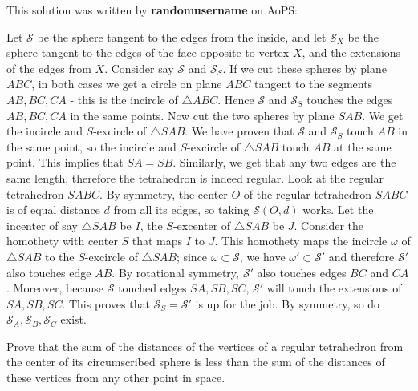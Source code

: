 \documentclass[12pt,a4paper]{memoir}
\theoremstyle{definition}
\begin{document}
\begin{solution}
	This solution was written by \textbf{randomusername} on AoPS:
	\begin{tasks}
		\task Let $\mathcal{S}$ be the sphere tangent to the edges from the inside, and let $\mathcal{S}_X$ be the sphere tangent to the edges of the face opposite to vertex $X$, and the extensions of the edges from $X$.
		Consider say $\mathcal{S}$ and $\mathcal{S}_S$. If we cut these spheres by plane $ABC$, in both cases we get a circle on plane $ABC$ tangent to the segments $AB,BC,CA$ - this is the incircle of $\triangle ABC$. Hence $\mathcal{S}$ and $\mathcal{S}_S$ touches the edges $AB,BC,CA$ in the same points.
		Now cut the two spheres by plane $SAB$. We get the incircle and $S$-excircle of $\triangle SAB$. We have proven that $\mathcal{S}$ and $\mathcal{S}_S$ touch $AB$ in the same point, so the incircle and $S$-excircle of $\triangle SAB$ touch $AB$ at the same point. This implies that $SA=SB$.
		Similarly, we get that any two edges are the same length, therefore the tetrahedron is indeed regular.
		\task Look at the regular tetrahedron $SABC$.
		By symmetry, the center $O$ of the regular tetrahedron $SABC$ is of equal distance $d$ from all its edges, so taking $\mathcal{S}(O,d)$ works.
		Let the incenter of say $\triangle SAB$ be $I$, the $S$-excenter of $\triangle SAB$ be $J$. Consider the homothety with center $S$ that maps $I$ to $J$. This homothety maps the incircle $\omega$ of $\triangle SAB$ to the $S$-excircle of $\triangle SAB$; since $\omega\subset \mathcal{S}$, we have $\omega'\subset\mathcal{S}'$ and therefore $\mathcal{S}'$ also touches edge $AB$. By rotational symmetry, $\mathcal{S}'$ also touches edges $BC$ and $CA$. Moreover, because $\mathcal{S}$ touched edges $SA,SB,SC$, $\mathcal{S}'$ will touch the extensions of $SA,SB,SC$. This proves that $\mathcal{S}_S=\mathcal{S}'$ is up for the job.
		By symmetry, so do $\mathcal{S}_A,\mathcal{S}_B,\mathcal{S}_C$ exist.
	\end{tasks}
\end{solution}




\begin{question}[name={1966 International Mathematical Olympiad}]
	Prove that the sum of the distances of the vertices of a regular tetrahedron from the center of its circumscribed sphere is less than the sum of the distances of these vertices from any other point in space.
\end{question}
\end{document}
